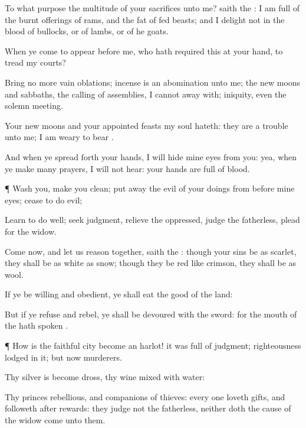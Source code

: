 {To
what purpose
{} the
multitude of your
sacrifices unto me?
saith the
{}: I am
full of the burnt
offerings of
rams, and the
fat of fed
beasts; and I
delight not in the
blood of
bullocks, or of
lambs, or of he
goats.

When ye
come to
appear
before me, who hath
required this at your
hand, to
tread my
courts?

Bring no
more
vain
oblations;
incense is an
abomination unto me; the new
moons and
sabbaths, the
calling of
assemblies, I cannot away
with;
{}
iniquity, even the solemn
meeting.

Your new
moons and your appointed
feasts my
soul
hateth: they are a
trouble unto me; I am
weary to
bear
{}.

And when ye spread
forth your
hands, I will
hide mine
eyes from you: yea, when ye make
many
prayers, I will not
hear: your
hands are
full of
blood.


\par }{\PP {}¶
Wash you, make you
clean; put
away the
evil of your
doings from
before mine
eyes;
cease to do
evil;

Learn to do
well;
seek
judgment,
relieve the
oppressed,
judge the
fatherless,
plead for the
widow.

Come
now, and let us reason
together,
saith the
{}: though your
sins be as
scarlet, they shall be as
white as
snow; though they be
red like
crimson, they shall be as
wool.

If ye be
willing and
obedient, ye shall
eat the
good of the
land:

But if ye
refuse and
rebel, ye shall be
devoured with the
sword: for the
mouth of the
{} hath
spoken
{}.


\par }{\PP {}¶ How is the
faithful
city become an
harlot! it was
full of
judgment;
righteousness
lodged in it; but now
murderers.

Thy
silver is become
dross, thy
wine
mixed with
water:

Thy
princes
{}
rebellious, and
companions of
thieves: every one
loveth
gifts, and
followeth after
rewards: they
judge not the
fatherless, neither doth the
cause of the
widow
come unto them.

}
